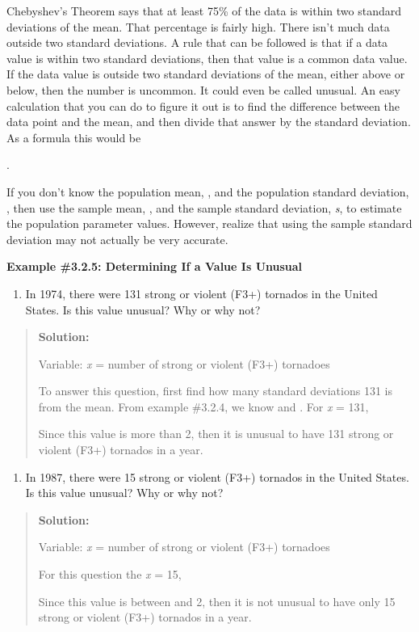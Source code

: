 \documentclass[]{book}
\providecommand{\tightlist}{%
  \setlength{\itemsep}{0pt}\setlength{\parskip}{0pt}}
\begin{document}
Chebyshev's Theorem says that at least 75\% of the data is within two
standard deviations of the mean. That percentage is fairly high. There
isn't much data outside two standard deviations. A rule that can be
followed is that if a data value is within two standard deviations, then
that value is a common data value. If the data value is outside two
standard deviations of the mean, either above or below, then the number
is uncommon. It could even be called unusual. An easy calculation that
you can do to figure it out is to find the difference between the data
point and the mean, and then divide that answer by the standard
deviation. As a formula this would be

.

If you don't know the population mean, , and the population standard
deviation, , then use the sample mean, , and the sample standard
deviation, \emph{s}, to estimate the population parameter values. However,
realize that using the sample standard deviation may not actually be
very accurate.

\textbf{Example \#3.2.5: Determining If a Value Is Unusual}

\begin{enumerate}
\def\labelenumi{\alph{enumi}.}
\tightlist
\item
  In 1974, there were 131 strong or violent (F3+) tornados in the
  United States. Is this value unusual? Why or why not?
\end{enumerate}

\begin{quote}
\textbf{Solution:}

Variable: \emph{x} = number of strong or violent (F3+) tornadoes

To answer this question, first find how many standard deviations 131
is from the mean. From example \#3.2.4, we know and . For \emph{x} = 131,

Since this value is more than 2, then it is unusual to have 131 strong
or violent (F3+) tornados in a year.
\end{quote}

\begin{enumerate}
\def\labelenumi{\alph{enumi}.}
\setcounter{enumi}{1}
\tightlist
\item
  In 1987, there were 15 strong or violent (F3+) tornados in the
  United States. Is this value unusual? Why or why not?
\end{enumerate}

\begin{quote}
\textbf{Solution:}

Variable: \emph{x} = number of strong or violent (F3+) tornadoes

For this question the \emph{x} = 15,

Since this value is between and 2, then it is not unusual to have only
15 strong or violent (F3+) tornados in a year.
\end{quote}
\end{document}
